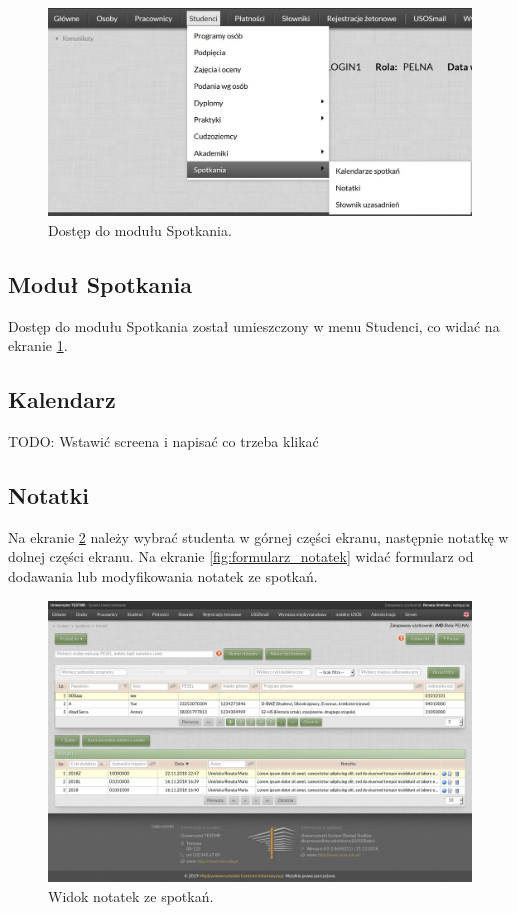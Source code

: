 \documentclass[licencjacka]{pracamgr}
\begin{document}
\begin{figure}[!]
  \includegraphics[width=\linewidth]{spotkaniaadm.jpg}
  \caption{Dostęp do modułu Spotkania.}
  \label{fig:modspoadm}
\end{figure}

\subsection{Moduł Spotkania}
Dostęp do modułu Spotkania został umieszczony w menu Studenci, co widać na ekranie \ref{fig:modspoadm}.

\subsection{Kalendarz}
TODO: Wstawić screena i napisać co trzeba klikać

\subsection{Notatki}
Na ekranie \ref{fig:notatki} należy wybrać studenta w górnej części ekranu, następnie notatkę w dolnej części ekranu.
Na ekranie \ref{fig:formularz_notatek} widać formularz od dodawania lub modyfikowania notatek ze spotkań.

\begin{figure}[!]
  \includegraphics[width=\linewidth]{widok_notatek.jpg}
  \caption{Widok notatek ze spotkań.}
  \label{fig:notatki}
\end{figure}
\end{document}
